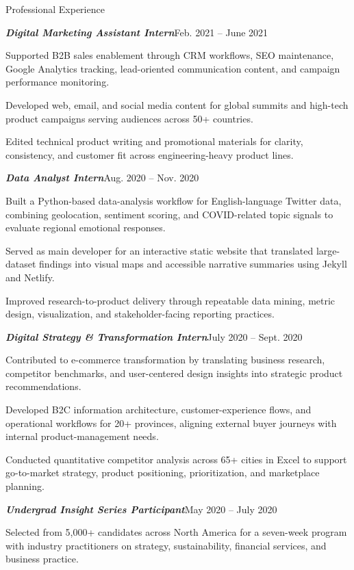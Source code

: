 \documentclass{resume} %
\begin{document}
\begin{rSection}{Professional Experience}
\begin{rSubsection}{\textbf{\textit{Digital Marketing Assistant Intern}}}{Feb. 2021 -- June 2021}{}{}
\item Supported B2B sales enablement through CRM workflows, SEO maintenance, Google Analytics tracking, lead-oriented communication content, and campaign performance monitoring.
\item Developed web, email, and social media content for global summits and high-tech product campaigns serving audiences across 50+ countries.
\item Edited technical product writing and promotional materials for clarity, consistency, and customer fit across engineering-heavy product lines.
\end{rSubsection}

\begin{rSubsection}{\textbf{\textit{Data Analyst Intern}}}{Aug. 2020 -- Nov. 2020}{}{}
\item Built a Python-based data-analysis workflow for English-language Twitter data, combining geolocation, sentiment scoring, and COVID-related topic signals to evaluate regional emotional responses.
\item Served as main developer for an interactive static website that translated large-dataset findings into visual maps and accessible narrative summaries using Jekyll and Netlify.
\item Improved research-to-product delivery through repeatable data mining, metric design, visualization, and stakeholder-facing reporting practices.
\end{rSubsection}

\begin{rSubsection}{\textbf{\textit{Digital Strategy \& Transformation Intern}}}{July 2020 -- Sept. 2020}{}{}
\item Contributed to e-commerce transformation by translating business research, competitor benchmarks, and user-centered design insights into strategic product recommendations.
\item Developed B2C information architecture, customer-experience flows, and operational workflows for 20+ provinces, aligning external buyer journeys with internal product-management needs.
\item Conducted quantitative competitor analysis across 65+ cities in Excel to support go-to-market strategy, product positioning, prioritization, and marketplace planning.
\end{rSubsection}

\begin{rSubsection}{\textbf{\textit{Undergrad Insight Series Participant}}}{May 2020 -- July 2020}{}{}
\item Selected from 5,000+ candidates across North America for a seven-week program with industry practitioners on strategy, sustainability, financial services, and business practice.
\end{rSubsection}
\end{rSection}
\end{document}
